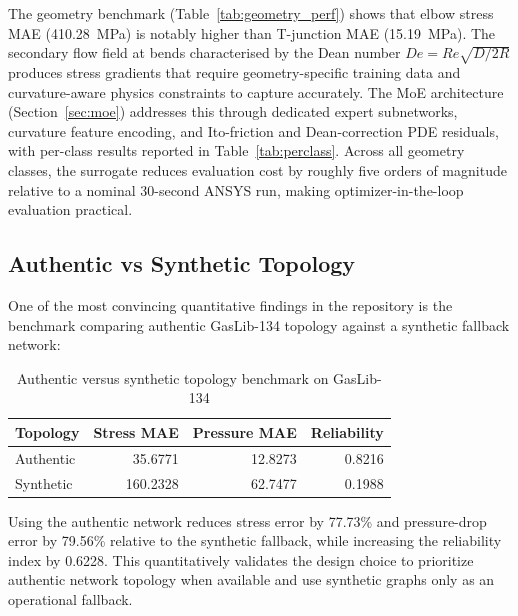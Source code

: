 \documentclass[conference]{IEEEtran}
\begin{document}
The geometry benchmark (Table~\ref{tab:geometry_perf}) shows that elbow stress MAE (410.28~MPa) is notably higher than T-junction MAE (15.19~MPa). The secondary flow field at bends characterised by the Dean number $De = Re\sqrt{D/2R}$ produces stress gradients that require geometry-specific training data and curvature-aware physics constraints to capture accurately. The MoE architecture (Section~\ref{sec:moe}) addresses this through dedicated expert subnetworks, curvature feature encoding, and Ito-friction and Dean-correction PDE residuals, with per-class results reported in Table~\ref{tab:perclass}. Across all geometry classes, the surrogate reduces evaluation cost by roughly five orders of magnitude relative to a nominal 30-second ANSYS run, making optimizer-in-the-loop evaluation practical.
 
\subsection{Authentic vs Synthetic Topology}

One of the most convincing quantitative findings in the repository is the benchmark comparing authentic GasLib-134 topology against a synthetic fallback network:
 
\begin{table}[!t]

\caption{Authentic versus synthetic topology benchmark on GasLib-134}

\label{tab:topology_compare}

\centering

\setlength{\tabcolsep}{5pt}

\begin{tabular}{lrrr}

\toprule

\textbf{Topology} & \textbf{Stress MAE} & \textbf{Pressure MAE} & \textbf{Reliability} \\

\midrule

Authentic & 35.6771  & 12.8273 & 0.8216 \\

Synthetic & 160.2328 & 62.7477 & 0.1988 \\

\bottomrule

\end{tabular}

\end{table}
 
Using the authentic network reduces stress error by 77.73\% and pressure-drop error by 79.56\% relative to the synthetic fallback, while increasing the reliability index by 0.6228. This quantitatively validates the design choice to prioritize authentic network topology when available and use synthetic graphs only as an operational fallback.
 
\end{document}
